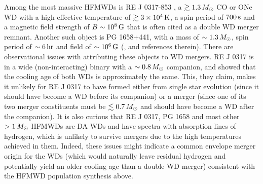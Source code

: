 


Among the most massive HFMWDs is RE J 0317-853 \citep{bars+95, kube+10}, a $\gtrsim1.3\,\Msun$ CO or ONe WD with a high effective temperature of $\gtrsim3\times10^4\,\mathrm{K}$, a spin period of $700\,\mathrm{s}$ and a magnetic field strength of $B\sim10^8\,\mathrm{G}$ that is often cited as a double WD merger remnant.  Another such object is PG 1658+441, with a mass of $\sim1.3\,\Msun$, spin period of $\sim6\,\mathrm{hr}$ and field of $\sim10^6\,\mathrm{G}$ (\citealt{ferrdg15}, and references therein).  There are observational issues with attributing these objects to WD mergers.  RE J 0317 is in a wide (non-interacting) binary with a $\sim0.8\,\Msun$ companion, and \cite{kube+10} showed that the cooling age of both WDs is approximately the same.  This, they claim, makes it unlikely for RE J 0317 to have formed either from single star evolution (since it should have become a WD before its companion) or a merger (since one of its two merger constituents must be $\lesssim0.7\,\Msun$ and should have become a WD after the companion).  It is also curious that RE J 0317, PG 1658 and most other $>1\,\Msun$ HFMWDs \citep{ferrdg15} are DA WDs and have spectra with absorption lines of hydrogen, which is unlikely to survive mergers due to the high temperatures achieved in them.  Indeed, these issues might indicate a common envelope merger origin for the WDs (which would naturally leave residual hydrogen and potentially yield an older cooling age than a double WD merger) consistent with the HFMWD population synthesis above.


